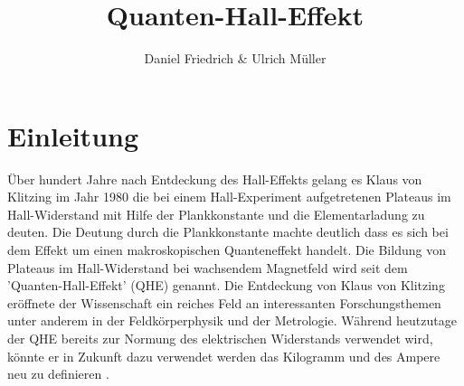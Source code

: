 \documentclass[paper=a4,fontsize=10pt,DIV=18,twocolumn,parskip=half]{scrartcl}
\numberwithin{equation}{section}    %
\begin{document}
\title{Quanten-Hall-Effekt}                  
\author{Daniel Friedrich \& Ulrich Müller}         
\date{}                                %
%
\section{Einleitung}
\label{Einleitung}
Über hundert Jahre nach Entdeckung des Hall-Effekts gelang es Klaus von Klitzing im Jahr 1980 die bei einem Hall-Experiment aufgetretenen Plateaus im Hall-Widerstand mit Hilfe der Plankkonstante und die Elementarladung zu deuten. Die Deutung durch die Plankkonstante machte deutlich dass es sich bei dem Effekt um einen makroskopischen Quanteneffekt handelt. Die Bildung von Plateaus im Hall-Widerstand bei wachsendem Magnetfeld wird seit dem 'Quanten-Hall-Effekt' (QHE) genannt. Die Entdeckung von Klaus von Klitzing eröffnete der Wissenschaft ein reiches Feld an interessanten Forschungsthemen unter anderem in der Feldkörperphysik und der Metrologie. Während heutzutage der QHE bereits zur Normung des elektrischen Widerstands verwendet wird, könnte er in Zukunft dazu verwendet werden das Kilogramm und des Ampere neu zu definieren \cite{janssen}. 
\end{document}
